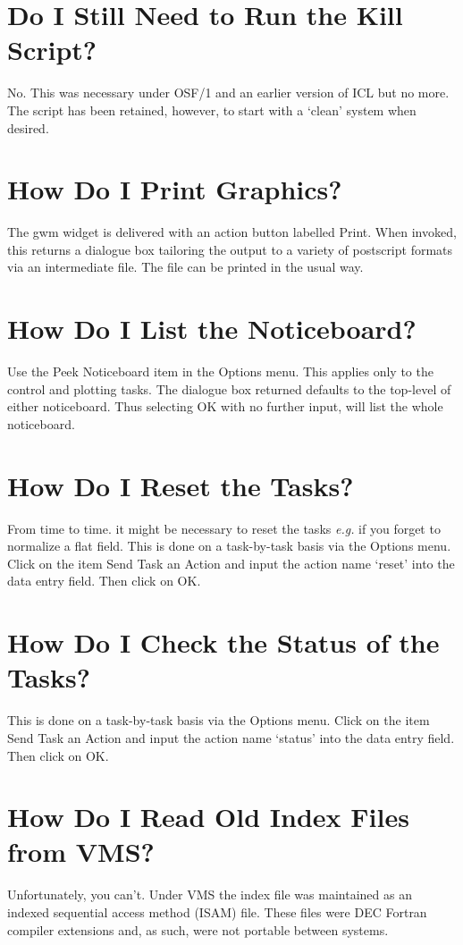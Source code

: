 \documentclass[a4paper]{book}
\renewcommand{\_}{{\tt\char'137}}
\begin{document}
\section{Do I Still Need to Run the Kill Script?}
No. This was necessary under OSF/1 and an earlier version of ICL but no more. The
script has been retained, however, to start with a `clean' system when desired.

\section{How Do I Print Graphics?}
The {\sc gwm} widget is delivered with an action button labelled {\sf Print}. When
invoked, this returns a dialogue box tailoring the output to a variety of postscript
formats via an intermediate file. The file can be printed in the usual way.

\section{How Do I List the Noticeboard?}
Use the {\sf Peek Noticeboard} item in the {\sf Options} menu. This applies only to
the control and plotting tasks. The dialogue box returned defaults to the top-level
of either noticeboard. Thus selecting {\sf OK} with no further input, will list the
whole noticeboard.

\section{How Do I Reset the Tasks?}
\label{reset}
From time to time. it might be necessary to reset the tasks {\em e.g.} if you forget to
normalize a {\sc flat} field. This is done on a task-by-task basis via the {\sf Options}
menu. Click on the item {\sf Send Task an Action} and input the action name `reset'
into the data entry field. Then click on {\sf OK}.

\section{How Do I Check the Status of the Tasks?}
This is done on a task-by-task basis via the {\sf Options}
menu. Click on the item {\sf Send Task an Action} and input the action name `status'
into the data entry field. Then click on {\sf OK}.

\section{How Do I Read Old Index Files from VMS?}
Unfortunately, you can't. Under VMS the index file was maintained as an indexed sequential
access method (ISAM) file. These files were DEC Fortran compiler extensions and, as such,
were not portable between systems. 
\end{document}
